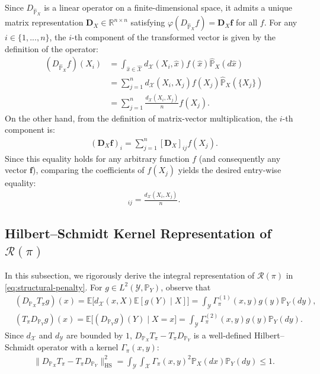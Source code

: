 \documentclass{article}
\theoremstyle{plain}
\theoremstyle{definition}
\theoremstyle{remark}
\begin{document}
Since $D_{\hat{\mathbb{P}}_X}$ is a linear operator on a finite-dimensional space, it admits a unique matrix representation $\mathbf{D}_X \in \mathbb{R}^{n \times n}$ satisfying $\varphi(D_{\hat{\mathbb{P}}_X} f) = \mathbf{D}_X \mathbf{f}$ for all $f$.
For any $i \in \{1, ..., n\}$, the $i$-th component of the transformed vector is given by the definition of the operator:
\begin{align*}
	(D_{\hat{\mathbb{P}}_X}f)(X_i) 
	&= \int_{\hat{x} \in \hat{\mathcal{X}}} d_{\mathcal{X}}(X_i, \hat{x}) f(\hat{x}) \hat{\mathbb{P}}_X(d\hat{x}) \\
	&= \sum_{j=1}^n d_{\mathcal{X}}(X_i, X_j) f(X_j) \hat{\mathbb{P}}_X(\{X_j\}) \\
	&= \sum_{j=1}^n \frac{d_{\mathcal{X}}(X_i, X_j)}{n} f(X_j).
\end{align*}
On the other hand, from the definition of matrix-vector multiplication, the $i$-th component is:
\begin{align*}
	(\mathbf{D}_X \mathbf{f})_i = \sum_{j=1}^n [\mathbf{D}_X]_{ij} f(X_j).
\end{align*}
Since this equality holds for any arbitrary function $f$ (and consequently any vector $\mathbf{f}$), comparing the coefficients of $f(X_j)$ yields the desired entry-wise equality:
\begin{align*}
	[\mathbf{D}_X]_{ij} = \frac{d_{\mathcal{X}}(X_i, X_j)}{n}.
\end{align*}

\subsection{Hilbert--Schmidt Kernel Representation of $\mathcal{R}(\pi)$}\label{pf:HS-operator}
In this subsection, we rigorously derive the integral representation of $\mathcal{R}(\pi)$ in \eqref{eq:structural-penalty}. For $g \in L^2(\mathcal{Y},\mathbb{P}_Y)$, observe that
\begin{align*}
	&(D_{\mathbb{P}_X}T_{\pi}g)(x) = \mathbb{E}\Big[d_{\mathcal{X}}(x,X)\mathbb{E}\left[g(Y) \mid X\right]\Big] = \int_{\mathcal{Y}} \Gamma_{\pi}^{(1)}(x,y)g(y)\mathbb{P}_Y(dy) , \\
	&(T_{\pi}D_{\mathbb{P}_Y}g)(x) = \mathbb{E}\Big[(D_{\mathbb{P}_Y}g)(Y) \mid X = x\Big] = \int_{\mathcal{Y}} \Gamma_{\pi}^{(2)}(x,y)g(y) \mathbb{P}_Y(dy) .
\end{align*}
Since $d_{\mathcal{X}}$ and $d_{\mathcal{Y}}$ are bounded by $1$, $D_{\mathbb{P}_X}T_{\pi} - T_{\pi}D_{\mathbb{P}_Y}$ is a well-defined Hilbert--Schmidt operator with a kernel $\Gamma_\pi(x,y)$:
\begin{align*}
	\| D_{\mathbb{P}_X}T_{\pi} - T_{\pi}D_{\mathbb{P}_Y} \|_{\mathrm{HS}}^2 = \int_{\mathcal{Y}}\int_{\mathcal{X}} \Gamma_\pi(x,y)^2\mathbb{P}_X(dx)\mathbb{P}_Y(dy) \leq 1 .
\end{align*}
\end{document}
